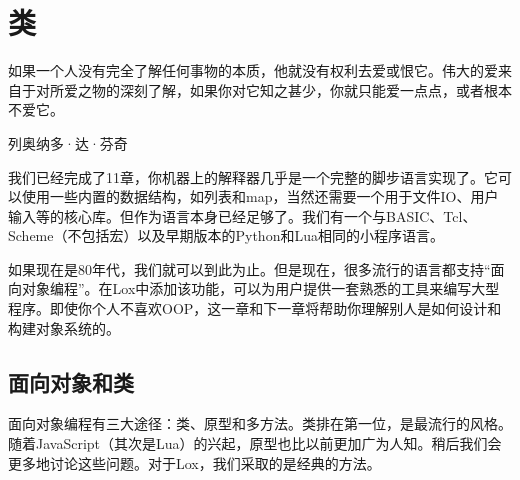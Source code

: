 \documentclass[cn,11pt,chinese]{elegantbook}
\newenvironment{code}[4][]
{\VerbatimEnvironment
  \begin{center}
  \begin{tcolorbox}[space to upper,
    skin=bicolor,
    colbacklower=black!75,
    collower=white,
    title={#4},
    halign=center,
    valign=center,
    nobeforeafter,
    halign lower=flush right,
    ]
    \begin{verbatim}}
    {\end{verbatim}\end{tcolorbox}\end{center}}
\begin{document}

\chapter{类}

\epigraph{如果一个人没有完全了解任何事物的本质，他就没有权利去爱或恨它。伟大的爱来自于对所爱之物的深刻了解，如果你对它知之甚少，你就只能爱一点点，或者根本不爱它。}{列奥纳多·达·芬奇}

我们已经完成了11章，你机器上的解释器几乎是一个完整的脚步语言实现了。它可以使用一些内置的数据结构，如列表和map，当然还需要一个用于文件IO、用户输入等的核心库。但作为语言本身已经足够了。我们有一个与BASIC、Tcl、Scheme（不包括宏）以及早期版本的Python和Lua相同的小程序语言。

如果现在是80年代，我们就可以到此为止。但是现在，很多流行的语言都支持“面向对象编程”。在Lox中添加该功能，可以为用户提供一套熟悉的工具来编写大型程序。即使你个人不喜欢OOP，这一章和下一章将帮助你理解别人是如何设计和构建对象系统的。

\section{面向对象和类}

面向对象编程有三大途径：类、原型和多方法。类排在第一位，是最流行的风格。随着JavaScript（其次是Lua）的兴起，原型也比以前更加广为人知。稍后我们会更多地讨论这些问题。对于Lox，我们采取的是经典的方法。
\end{document}
